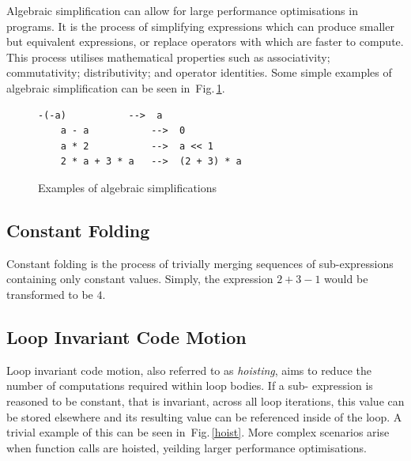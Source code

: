 \documentclass[12pt,openany,a4paper]{book}
\newcommand{\fig}[1]  {Fig.\,\ref{#1}}		%
\begin{document}
Algebraic simplification can allow for large performance optimisations in
programs. It is the process of simplifying expressions which can produce smaller
but equivalent expressions, or replace operators with which are faster to compute. 
This process utilises mathematical properties such as associativity; commutativity; 
distributivity; and operator identities. Some simple examples of algebraic
simplification can be seen in~\fig{simp}. 

\begin{figure}[htbp]
    \hspace{0.25\textwidth}
    \begin{minipage}[c]{0.5\linewidth}
    \begin{lstlisting}[frame=single, basicstyle=\ttfamily\small, tabsize=1, columns=fullflexible]
    -(-a)           -->  a
    a - a           -->  0
    a * 2           -->  a << 1
    2 * a + 3 * a   -->  (2 + 3) * a
    \end{lstlisting}
    \end{minipage}
    \caption{Examples of algebraic simplifications}
    \label{simp}
\end{figure}

\subsection{Constant Folding}
\label{cf}

Constant folding is the process of trivially merging sequences of sub-expressions 
containing only constant values. Simply, the expression \(2 + 3 - 1\) would be 
transformed to be \(4\).

\subsection{Loop Invariant Code Motion}
\label{licm}

Loop invariant code motion, also referred to as \emph{hoisting}, aims to reduce
the number of computations required within loop bodies. If a sub-
expression is reasoned to be constant, that is invariant, across all loop iterations, 
this value can be stored elsewhere and its resulting value can be referenced inside of the
loop. A trivial example of this can be seen in~\fig{hoist}. More complex scenarios
arise when function calls are hoisted, yeilding larger performance optimisations.
\end{document}
